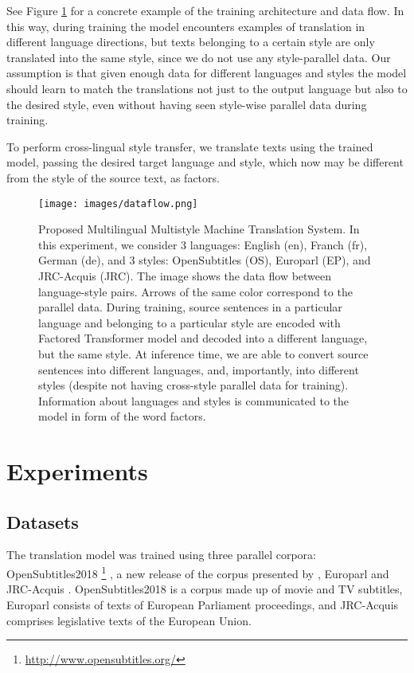 \documentclass[11pt,a4paper]{article}
\begin{document}
See Figure \ref{fig-dataflow} for a concrete example of the training architecture and data flow.
In this way, during training the model encounters examples of translation in different language directions, but texts belonging to a certain style are only translated into the same style, since we do not use any style-parallel data. Our assumption is that given enough data for different languages and styles the model should learn to match the translations not just to the output language but also to the desired style, even without having seen style-wise parallel data during training.

To perform cross-lingual style transfer, we translate texts using the trained model, passing the desired target language and style, which now may be different from the style of the source text, as factors.

\begin{figure}[t]
    \texttt{[image: images/dataflow.png]}
  \caption{\small Proposed Multilingual Multistyle Machine Translation System. In this experiment, we consider 3 languages: English (en), Franch (fr), German (de), and 3 styles: OpenSubtitles (OS), Europarl (EP), and JRC-Acquis (JRC). The image shows the data flow between language-style pairs. Arrows of the same color correspond to the parallel data. During training, source sentences in a particular language and belonging to a particular style are encoded with Factored \cite{factors} Transformer \cite{transformer} model and decoded into a different language, but the same style. At inference time, we are able to convert source sentences into different languages, and, importantly, into different styles (despite not having cross-style parallel data for training). Information about languages and styles is communicated to the model in form of the word factors.}
  \label{fig-dataflow}
\end{figure}



\section{Experiments}
\label{sec:experiments}



\subsection{Datasets}

The translation model was trained using three parallel corpora: OpenSubtitles2018 \footnote{\url{http://www.opensubtitles.org/}} , a new release of the corpus presented by
\citet{opensubs}, Europarl \citep{europarl} and JRC-Acquis \citep{jrc}. OpenSubtitles2018 is a corpus made up of movie and TV subtitles, Europarl consists of texts of European Parliament proceedings, and JRC-Acquis comprises legislative texts of the European Union.
\end{document}
